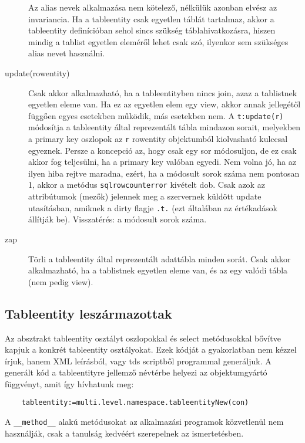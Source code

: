 \begin{description}
    Az alias nevek alkalmazása nem kötelező, nélkülük azonban
    elvész az invariancia. Ha a tableentity csak egyetlen táblát
    tartalmaz, akkor a tableentity definícióban sehol sincs
    szükség táblahivatkozásra, hiszen mindig
    a tablist egyetlen eleméről lehet csak szó, ilyenkor
    sem szükséges alias nevet használni.
\item[update(rowentity)]
    Csak akkor alkalmazható, ha a tableentityben nincs join, 
    azaz a tablistnek egyetlen eleme van. Ha ez az egyetlen elem egy view, 
    akkor annak jellegétől függően egyes esetekben működik, más esetekben nem.
    A \verb!t:update(r)! módosítja a tableentity által reprezentált
    tábla mindazon sorait, melyekben a primary key oszlopok
    az \verb!r! rowentity objektumból kiolvasható kulccsal egyeznek.
    Persze a koncepció az, hogy csak egy sor módosuljon,
    de ez csak akkor fog teljesülni, ha a primary key valóban egyedi.
    Nem volna jó, ha az ilyen hiba rejtve maradna, ezért, ha a módosult
    sorok száma nem pontosan 1, akkor a metódus \verb!sqlrowcounterror! 
    kivételt dob.  Csak azok az attribútumok (mezők) jelennek meg
    a szervernek küldött update utasításban,
    amiknek a dirty flagje \verb!.t.! (ezt általában az értékadások állítják be).
    Visszatérés: a módosult sorok száma. 
\item[zap]
    Törli a tableentity által reprezentált adattábla minden sorát.
    Csak akkor alkalmazható, ha a tablistnek egyetlen eleme van,
    és az egy valódi tábla (nem pedig view).
\end{description}


\subsection{Tableentity leszármazottak}

Az absztrakt tableentity osztályt  oszlopokkal és 
select metódusokkal bővítve kapjuk a konkrét tableentity
osztályokat. Ezek kódját a gyakorlatban nem kézzel írjuk, 
hanem XML leírásból, vagy tds scriptből  programmal generáljuk. 
A generált kód a tableentityre jellemző névtérbe helyezi 
az objektumgyártó függvényt, amit így hívhatunk meg:
\begin{verbatim}
    tableentity:=multi.level.namespace.tableentityNew(con)
\end{verbatim}

A \verb!__method__! alakú metódusokat
az alkalmazási programok közvetlenül nem használják, 
csak a tanulság kedvéért szerepelnek az ismertetésben.

